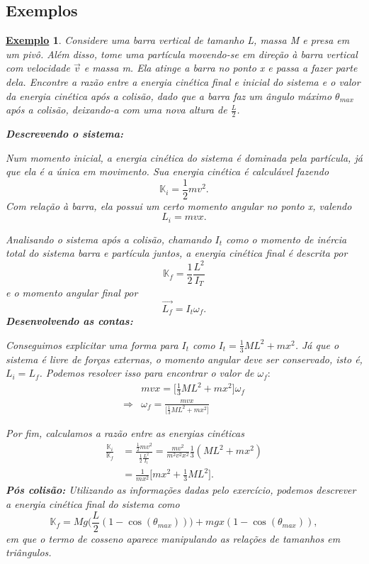 \documentclass{article}
\newtheorem{example}{\underline{Exemplo}}
\begin{document}
\subsection{Exemplos}
\begin{example}
  Considere uma barra vertical de tamanho L, massa M e presa em um pivô. Além disso, tome uma partícula movendo-se em direção à barra vertical com velocidade \(\vec{v}\) e massa m.
  Ela atinge a barra no ponto x e passa a fazer parte dela. Encontre a razão entre a energia cinética final e inicial do sistema e o valor da energia cinética após a colisão, dado
  que a barra faz um ângulo máximo \(\theta_{max}\) após a colisão, deixando-a com uma nova altura de \(\frac{L}{2}\).

  \textbf{Descrevendo o sistema:} 

  Num momento inicial, a energia cinética do sistema é dominada pela partícula, já que ela é a única em movimento. Sua energia cinética é calculável fazendo 
  \[
    \mathbb{K}_{i} = \frac{1}{2}mv^{2}.
  \]
  Com relação à barra, ela possui um certo momento angular no ponto x, valendo 
  \[
    L_{i} = mvx.
  \]

  Analisando o sistema após a colisão, chamando \(I_{t}\) como o momento de inércia total do sistema barra e partícula juntos, a energia cinética final
  é descrita por 
  \[
    \mathbb{K}_{f} = \frac{1}{2}\frac{L^{2}}{I_{T}}
  \]
  e o momento angular final por 
  \[
    \vec{L_{f}} = I_{t}\omega_{f}.
  \]
  \textbf{Desenvolvendo as contas:}

  Conseguimos explicitar uma forma para \(I_{t}\) como \(I_{t} = \frac{1}{3}ML^{2} + mx^{2}\). Já que o sistema é livre de forças externas, o momento angular deve ser conservado, isto é,
  \(L_{i} = L_{f}\). Podemos resolver isso para encontrar o valor de \(\omega_{f}:\)
  \begin{align*}
   &mvx = \biggl[\frac{1}{3}ML^{2} + mx^{2}\biggr]\omega_{f}\\
    \Rightarrow &\omega_{f} = \frac{mvx}{\biggl[\frac{1}{3}ML^{2}+mx^{2}\biggr]}
  \end{align*}

  Por fim, calculamos a razão entre as energias cinéticas
  \begin{align*}
    \frac{\mathbb{K}_{i}}{\mathbb{K}_{f}} &= \frac{\frac{1}{2}mv^{2}}{\frac{1}{2}\frac{L^{2}}{I_{t}}} = \frac{mv^{2}}{m^{2}v^{2}x^{2}}\frac{1}{3}(ML^{2}+mx^{2})\\
                                          &= \frac{1}{mx^{2}}\biggl[mx^{2}+\frac{1}{3}ML^{2}\biggr].
  \end{align*}
  \textbf{Pós colisão:}
  Utilizando as informações dadas pelo exercício, podemos descrever a energia cinética final do sistema como 
  \[
    \mathbb{K}_{f}=Mg \biggl(\frac{L}{2}(1-\cos{(\theta_{max} )})\biggr) + mgx(1-\cos{(\theta_{max} )}),
  \]
  em que o termo de cosseno aparece manipulando as relações de tamanhos em triângulos.
\end{example}
\end{document}

